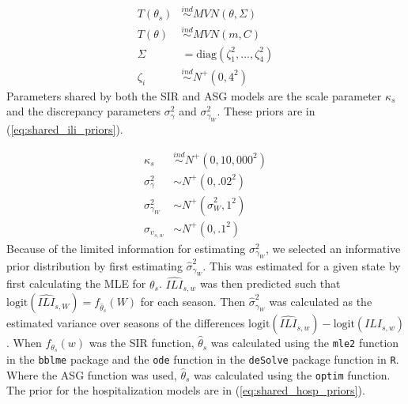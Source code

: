 \begin{equation}
\begin{aligned}
\label{eq:ili_prior}
                T(\theta_s) &\overset{ind}{\sim} MVN(\theta, \Sigma) \\
                T(\theta) &\overset{ind}{\sim} MVN(m, C)\\
                \Sigma &= \text{diag}(\zeta^2_1,...,\zeta^2_4) \\
                \zeta_i &\overset{ind}{\sim} N^+(0,4^2)
\end{aligned}
\end{equation}
Parameters shared by both the SIR and ASG models are the scale parameter 
$\kappa_s$ and the discrepancy parameters $\sigma_{\gamma}^2$ and 
$\sigma_{\gamma_W}^2$. These priors are in (\ref{eq:shared_ili_priors}). 

\begin{equation}
\begin{aligned}
    \label{eq:shared_ili_priors}
        \kappa_s &\overset{ind}{\sim} N^+(0, 10,000^2) \\
        \sigma_{\gamma}^2 &\sim N^+(0, .02^2) \\
        \sigma_{\gamma_W}^2 &\sim N^+(\hat{\sigma}_W^2, 1^2) \\
        \sigma_{\upsilon_{s,w}} &\sim N^+(0, .1^2)
\end{aligned}
\end{equation}
Because of the limited information for estimating $\sigma_{\gamma_W}^2$, 
we selected an informative prior distribution by first estimating  
$\hat{\sigma}_{\gamma_W}^2$. This was estimated for a given state by first 
calculating the MLE for $\theta_s$. 
$\widehat{ILI}_{s,w}$ was then predicted such that 
$\text{logit}(\widehat{ILI}_{s,W}) = f_{\hat{\theta}_s}(W)$ for each season. 
Then $\hat{\sigma}_{\gamma_W}^2$ was calculated as the estimated variance over 
seasons of the differences 
$\text{logit}(\widehat{ILI}_{s,w}) - \text{logit}(ILI_{s,w})$. 
When $f_{\theta_s}(w)$ was the SIR function, $\widehat{\theta}_s$ was 
calculated using the \texttt{mle2} function in the \texttt{bblme} package 
\cite[]{bolker2023bblme} and the \texttt{ode} function in the \texttt{deSolve} 
package \cite[]{soetaert2010desolve} function in \texttt{R}. Where the ASG 
function was used,  $\hat{\theta}_s$ was calculated using the \texttt{optim} 
function.
The prior for the hospitalization models are in (\ref{eq:shared_hosp_priors}).


